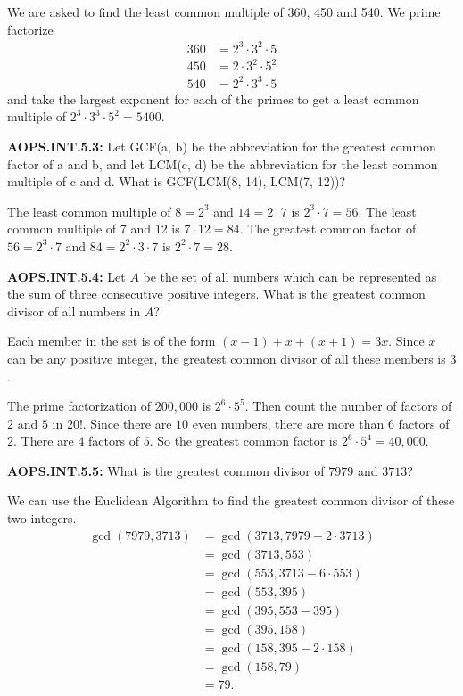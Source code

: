 \documentclass[11pt]{article}
\newenvironment{uzdevums}[1][\unskip]{%
\vspace{3mm}
\noindent
\textbf{#1:}
\noindent}
{}
\begin{document}
We are asked to find the least common multiple of 360, 450 and 540. We prime factorize \begin{align*}
360 &= 2^3\cdot 3^2\cdot 5 \\
450 &= 2 \cdot3^2 \cdot 5^2 \\
540 &= 2^2\cdot 3^3 \cdot 5
\end{align*} and take the largest exponent for each of the primes to get a least common multiple of $2^3\cdot 3^3\cdot 5^2=\boxed{5400}$.

\begin{uzdevums}[AOPS.INT.5.3]
Let GCF(a, b) be the abbreviation for the greatest common factor of a and b, and let LCM(c, d) be the abbreviation for the least common multiple of c and d. What is GCF(LCM(8, 14), LCM(7, 12))?
\end{uzdevums}

The least common multiple of $8=2^3$ and $14=2\cdot 7$ is $2^3\cdot 7 = 56$. The least common multiple of 7 and 12 is $7\cdot 12=84$. The greatest common factor of $56=2^3\cdot 7$ and $84=2^2\cdot 3 \cdot 7$ is $2^2\cdot 7=\boxed{28}$.

\begin{uzdevums}[AOPS.INT.5.4]
Let $A$ be the set of all numbers which can be represented as the sum of three consecutive positive integers. What is the greatest common divisor of all numbers in $A$?
\end{uzdevums}

Each member in the set is of the form $(x-1)+x+(x+1)=3x$. Since $x$ can be any positive integer, the greatest common divisor of all these members is $\boxed{3}$.

The prime factorization of $200,000$ is $2^6 \cdot 5^5$. Then count the number of factors of $2$ and $5$ in $20!$. Since there are $10$ even numbers, there are more than $6$ factors of $2$. There are $4$ factors of $5$. So the greatest common factor is $2^6 \cdot 5^4=\boxed{40,\!000}$.

\begin{uzdevums}[AOPS.INT.5.5]
What is the greatest common divisor of $7979$ and $3713$?
\end{uzdevums}

We can use the Euclidean Algorithm to find the greatest common divisor of these two integers. \begin{align*}
\gcd(7979, 3713) &= \gcd(3713, 7979 - 2\cdot 3713) \\
&= \gcd(3713, 553) \\
&= \gcd(553, 3713 - 6\cdot 553) \\
&= \gcd(553, 395) \\
&= \gcd(395, 553 - 395) \\
&= \gcd(395, 158) \\
&= \gcd(158, 395- 2\cdot 158) \\
&= \gcd(158, 79) \\
&= \boxed{79}.
\end{align*}
\end{document}
